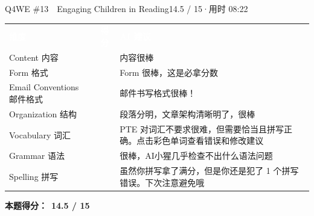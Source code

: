 \begin{qblock}{Q4\quad WE \#13\ \ Engaging Children in Reading}{14.5 / 15\quad·\quad 用时 08:22}
{\small\scorehead
\begin{tabularx}{\linewidth}{l c Y}
\textcolor{white}{\bfseries 维度} & \textcolor{white}{\bfseries 得分} & \textcolor{white}{\bfseries AI 建议}\\
Content 内容              &    & 内容很棒\\
Form 格式                &    & Form 很棒，这是必拿分数\\
Email Conventions 邮件格式 &    & 邮件书写格式很棒！\\
Organization 结构         &    & 段落分明，文章架构清晰明了，很棒\\
Vocabulary 词汇           &  & PTE 对词汇不要求很难，但需要恰当且拼写正确。点击彩色单词查看错误和修改建议\\
Grammar 语法              &    & 很棒，AI小猩几乎检查不出什么语法问题\\
Spelling 拼写             &    & 虽然你拼写拿了满分，但是你还是犯了 1 个拼写错误。下次注意避免哦\\
\end{tabularx}}
\smallskip
\textbf{本题得分：}\ {\color{cAccent}\bfseries 14.5 / 15}

\end{qblock}
